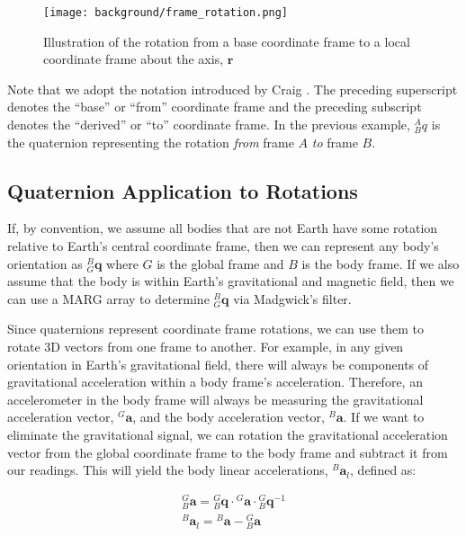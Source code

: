 \begin{figure}[h!]
    \caption[Illustration of rotation between coordinates frame about an axis]{Illustration of the rotation from a base coordinate frame to a local coordinate frame about the axis, $\pmb{r}$}
    \centering
    \texttt{[image: background/frame\_rotation.png]}
\end{figure}

Note that we adopt the notation introduced by Craig \cite{Craig:2022}. 
The preceding superscript denotes the ``base'' or ``from'' coordinate frame and the preceding subscript denotes the ``derived'' or ``to'' coordinate frame. 
In the previous example, ${}_B^Aq$ is the quaternion representing the rotation \textit{from} frame $A$ \textit{to} frame $B$.

\subsection{Quaternion Application to Rotations}

If, by convention, we assume all bodies that are not Earth have some rotation relative to Earth’s central coordinate frame, then we can represent any body’s orientation as ${}^B_G\pmb{q}$ where $G$ is the global frame and $B$ is the body frame. 
If we also assume that the body is within Earth’s gravitational and magnetic field, then we can use a MARG array to determine ${}^B_G\pmb{q}$ via Madgwick’s filter.

Since quaternions represent coordinate frame rotations, we can use them to rotate 3D vectors from one frame to another. 
For example, in any given orientation in Earth’s gravitational field, there will always be components of gravitational acceleration within a body frame’s acceleration. 
Therefore, an accelerometer in the body frame will always be measuring the gravitational acceleration vector, ${}^G\pmb{a}$, and the body acceleration vector, ${}^B\pmb{a}$. 
If we want to eliminate the gravitational signal, we can rotation the gravitational acceleration vector from the global coordinate frame to the body frame and subtract it from our readings. 
This will yield the body linear accelerations, ${}^B\pmb{a}_l$, defined as:

\begin{gather}
    {}^G_B\pmb{a} = {}^G_B\pmb{q} \cdot {}^G\pmb{a} \cdot {}^G_B\pmb{q}^{-1} \\
    {}^B\pmb{a}_l = {}^B\pmb{a} - {}^G_B\pmb{a}
\end{gather}

